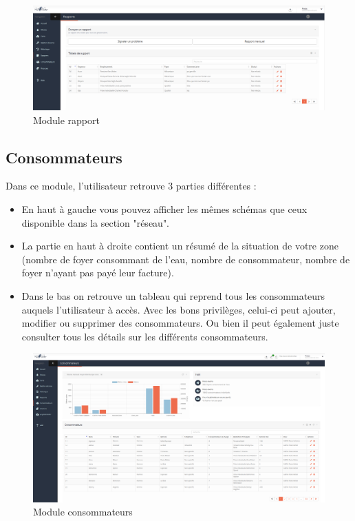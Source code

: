 \documentclass{EPL-master-thesis-covers-FR}
\begin{document}
				\begin{figure}[H]
					\centering
					\includegraphics[width=1\textwidth]{images/rapport}
					\caption{Module rapport}
				\end{figure}
			
			\subsection{Consommateurs}
				Dans ce module, l'utilisateur retrouve 3 parties différentes :
				\begin{itemize}
					\item En haut à gauche vous pouvez afficher les mêmes schémas que ceux disponible dans la section "réseau".
					\item La partie en haut à droite contient un résumé de la situation de votre zone (nombre de foyer consommant de l'eau, nombre de consommateur, nombre de foyer n'ayant pas payé leur facture).
					\item Dans le bas on retrouve un tableau qui reprend tous les consommateurs auquels l'utilisateur à accès. Avec les bons privilèges, celui-ci peut ajouter, modifier ou supprimer des consommateurs. Ou bien il peut également juste consulter tous les détails sur les différents consommateurs.
				\end{itemize}
				
				\begin{figure}[H]
					\centering
					\includegraphics[width=1\textwidth]{images/consommateurs}
					\caption{Module consommateurs}
				\end{figure}
			
\end{document}
